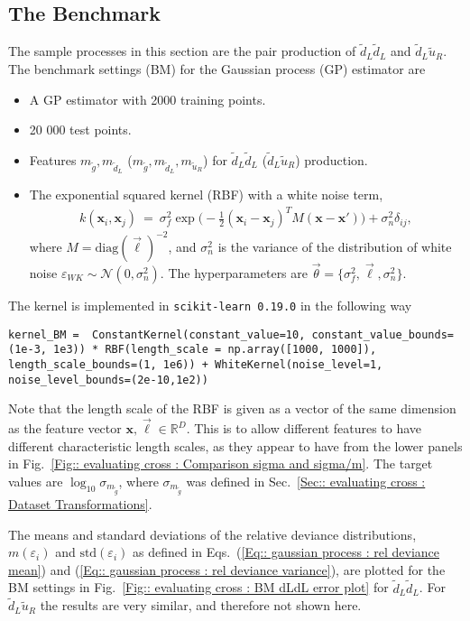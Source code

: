 \documentclass[twoside,english]{uiofysmaster}
\begin{document}
{{\subsection{The Benchmark}\label{Sec:: evaluating cross : The Benchmark}

The sample processes in this section are the pair production of $\widetilde{d}_L \widetilde{d}_L$ and $\widetilde{d}_L \widetilde{u}_R$. The benchmark settings (BM) for the Gaussian process (GP) estimator are 
\begin{itemize}
\item A GP estimator with 2000 training points.
\item 20 000 test points.
\item Features $m_{\widetilde{g}}, m_{\widetilde{d}_L}$ ($m_{\widetilde{g}}, m_{\widetilde{d}_L}, m_{\widetilde{u}_R}$) for $\widetilde{d}_L \widetilde{d}_L$ ($\widetilde{d}_L \widetilde{u}_R$) production.
\item The exponential squared kernel (RBF) with a white noise term, 
\begin{align}
k(\textbf{x}_i, \textbf{x}_j)~=~\sigma_f^2 \exp \big(-\frac{1}{2} (\textbf{x}_i-\textbf{x}_j)^TM(\textbf{x} - \textbf{x}') \big) + \sigma_n^2 \delta_{ij},
\end{align}
where $M = \textrm{diag}(\vec{\ell})^{-2}$, and $\sigma_n^2$ is the variance of the distribution of white noise $\varepsilon_{WK} \sim \mathcal{N}(0, \sigma_n^2)$. The hyperparameters are $\vec{\theta} = \{ \sigma^2_f, \vec{\ell}, \sigma_n^2\}.$
\end{itemize}
The kernel is implemented in \verb|scikit-learn 0.19.0| in the following way 
\begin{lstlisting}
kernel_BM =  ConstantKernel(constant_value=10, constant_value_bounds=(1e-3, 1e3)) * RBF(length_scale = np.array([1000, 1000]), length_scale_bounds=(1, 1e6)) + WhiteKernel(noise_level=1, noise_level_bounds=(2e-10,1e2))
\end{lstlisting} 
Note that the length scale of the RBF is given as a vector of the same dimension as the feature vector $\textbf{x},\vec{\ell} \in \mathbb{R}^D$. This is to allow different features to have different characteristic length scales, as they appear to have from the lower panels in Fig.~\ref{Fig:: evaluating cross : Comparison sigma and sigma/m}. The target values are $\log_{10} \sigma_{m_{\widetilde{g}}}$, where $\sigma_{m_{\widetilde{g}}}$ was defined in Sec.~\ref{Sec:: evaluating cross : Dataset Transformations}.

The means and standard deviations of the relative deviance distributions, $m(\varepsilon_i)$ and $\text{std}(\varepsilon_i)$ as defined in Eqs.~(\ref{Eq:: gaussian process : rel deviance mean}) and (\ref{Eq:: gaussian process : rel deviance variance}), are plotted for the BM settings in Fig.~\ref{Fig:: evaluating cross : BM dLdL error plot} for $\widetilde{d}_L \widetilde{d}_L$. For $\widetilde{d}_L \widetilde{u}_R$  the results are very similar, and therefore not shown here. 

}}
\end{document}
